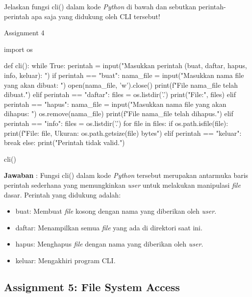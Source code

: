 \documentclass[12pt]{article}
\begin{document}
\vspace{0.2cm}

Jelaskan fungsi cli() dalam kode \textit{Python} di bawah dan sebutkan perintah-perintah apa saja yang didukung oleh CLI tersebut!

\begin{python}
Assignment 4

import os

def cli():
    while True:
        perintah = input("Masukkan perintah (buat, daftar, hapus, info, keluar): ")
        if perintah == "buat":
            nama_file = input("Masukkan nama file yang akan dibuat: ")
            open(nama_file, 'w').close()
            print(f"File {nama_file} telah dibuat.")
        elif perintah == "daftar":
            files = os.listdir('.')
            print("File:", files)
        elif perintah == "hapus":
            nama_file = input("Masukkan nama file yang akan dihapus: ")
            os.remove(nama_file)
            print(f"File {nama_file} telah dihapus.")
        elif perintah == "info":
            files = os.listdir('.')
            for file in files:
                if os.path.isfile(file):
                    print(f"File: {file}, Ukuran: {os.path.getsize(file)} bytes")
        elif perintah == "keluar":
            break
        else:
            print("Perintah tidak valid.")

cli()

\end{python}

\textbf{Jawaban} : Fungsi cli() dalam kode \textit{Python} tersebut merupakan antarmuka baris perintah sederhana yang memungkinkan \textit{user} untuk melakukan manipulasi \textit{file} dasar. Perintah yang didukung adalah:

\begin{itemize}
    \item buat: Membuat \textit{file} kosong dengan nama yang diberikan oleh \textit{user}.
    \item daftar: Menampilkan semua \textit{file} yang ada di direktori saat ini.
    \item hapus: Menghapus \textit{file} dengan nama yang diberikan oleh \textit{user}.
    \item keluar: Mengakhiri program CLI.
\end{itemize}


\subsection{Assignment 5: File System Access}
\end{document}
